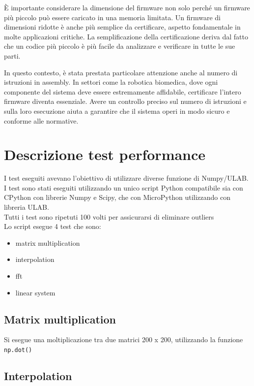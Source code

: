 \documentclass[12pt,a4paper]{report}
\begin{document}
È importante considerare la dimensione del firmware non solo perché un firmware più piccolo può essere caricato in una memoria limitata. Un firmware di dimensioni ridotte è anche più semplice da certificare, aspetto fondamentale in molte applicazioni critiche. La semplificazione della certificazione deriva dal fatto che un codice più piccolo è più facile da analizzare e verificare in tutte le sue parti.

In questo contesto, è stata prestata particolare attenzione anche al numero di istruzioni in assembly. In settori come la robotica biomedica, dove ogni componente del sistema deve essere estremamente affidabile, certificare l'intero firmware diventa essenziale. Avere un controllo preciso sul numero di istruzioni e sulla loro esecuzione aiuta a garantire che il sistema operi in modo sicuro e conforme alle normative.


\section{Descrizione test performance}\label{descrizione-test-performance}

I test eseguiti avevano l'obiettivo di utilizzare
diverse funzione di Numpy/ULAB.\\
I test sono stati eseguiti utilizzando un unico script Python
compatibile sia con CPython con librerie Numpy e Scipy, che con
MicroPython utilizzando con libreria ULAB.\\
Tutti i test sono ripetuti 100 volti per assicurarsi di eliminare
outliers\\
Lo script esegue 4 test che sono:

\begin{itemize}
\item
  matrix multiplication
\item
  interpolation
\item
  fft
\item
  linear system
\end{itemize}

\subsection{Matrix multiplication}\label{matrix-multiplication}

Si esegue una moltiplicazione tra due matrici 200 x 200, utilizzando la
funzione \texttt{np.dot()}

\subsection{Interpolation}\label{interpolation}
\end{document}
